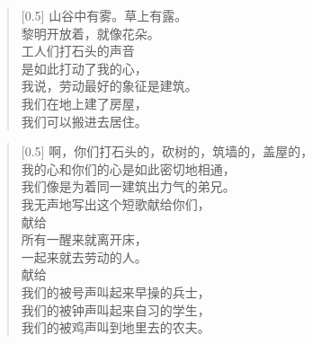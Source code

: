 \documentclass[12pt,UTF-8,openany]{ctexbook}
\begin{document}
\begin{large}
    
    \begin{verse}[0.5\linewidth]
        山谷中有雾。草上有露。 \\
        黎明开放着，就像花朵。 \\
        工人们打石头的声音 \\
        是如此打动了我的心， \\
        我说，劳动最好的象征是建筑。 \\
        我们在地上建了房屋， \\
        我们可以搬进去居住。
    \end{verse}
    
    
    \begin{verse}[0.5\linewidth]
        啊，你们打石头的，砍树的，筑墙的，盖屋的， \\
        我的心和你们的心是如此密切地相通， \\
        我们像是为着同一建筑出力气的弟兄。 \\
        我无声地写出这个短歌献给你们， \\
        献给 \\
        所有一醒来就离开床， \\
        一起来就去劳动的人。 \\
        献给 \\
        我们的被号声叫起来早操的兵士， \\
        我们的被钟声叫起来自习的学生， \\
        我们的被鸡声叫到地里去的农夫。
    \end{verse}
    
\end{large}
\end{document}
